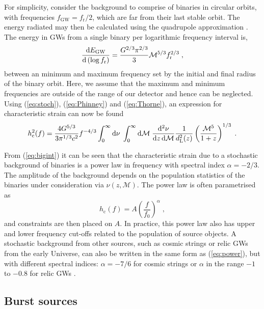 For simplicity, consider the background to comprise of binaries in circular orbits, with frequencies $f_\mathrm{GW} =f_{\mathrm{r}}/2$, which are far from their last stable orbit. The energy radiated may then be calculated using the quadrupole approximation \citep{petersmathews1963}. The energy in GWs from a single binary per logarithmic frequency interval is, 
\begin{equation}\label{eq:Thorne}
\frac{\mathrm{d}E_{\mathrm{GW}}}{\mathrm{d}\left(\log f_{\mathrm{r}} \right)} = \frac{G^{2/3}\pi^{2/3}}{3}{\cal{M}}^{5/3}f_{\mathrm{r}}^{2/3} \; ,
\end{equation}
between an minimum and maximum frequency set by the initial and final radius of the binary orbit. Here, we assume that the maximum and minimum frequencies are outside of the range of our detector and hence can be neglected. Using (\ref{eq:stoch}), (\ref{eq:Phinney}) and (\ref{eq:Thorne}), an expression for characteristic strain can now be found \citep{SesanaVecchioColancino}
\begin{equation}\label{eq:bigint}
h_\mathrm{c}^{2}(f) = \frac{4G^{5/3}}{3\pi^{1/3}c^{2}}f^{-4/3}\int_{0}^{\infty}\mathrm{d}\nu\;\int_{0}^{\infty}\mathrm{d}{\cal{M}}\;\frac{\mathrm{d}^{2}\nu}{\mathrm{d}z\,\mathrm{d}{\mathcal{M}}}\frac{1}{d_{\mathrm{L}}^{2}(z)}\left( \frac{{\mathcal{M}}^{5}}{1+z} \right)^{1/3}\; .
\end{equation}

From (\ref{eq:bigint}) it can be seen that the characteristic strain due to a stochastic background of binaries is a power law in frequency with spectral index $\alpha=-2/3$. The amplitude of the background depends on the population statistics of the binaries under consideration via $\nu(z,{\mathcal{M}})$. The power law is often parametrised as
\begin{equation}\label{eq:power} 
h_\mathrm{c}(f) = A\left(\frac{f}{f_{0}}\right)^{\alpha}\; , 
\end{equation}
and constraints are then placed on $A$. In practice, this power law also has upper and lower frequency cut-offs related to the population of source objects. A stochastic background from other sources, such as cosmic strings or relic GWs from the early Universe, can also be written in the same form as (\ref{eq:power}), but with different spectral indices: $\alpha=-7/6$ for cosmic strings or $\alpha$ in the range $-1$ to $-0.8$ for relic GWs \citep{Jenet}.


\subsection{Burst sources}\label{sec:bursts}

